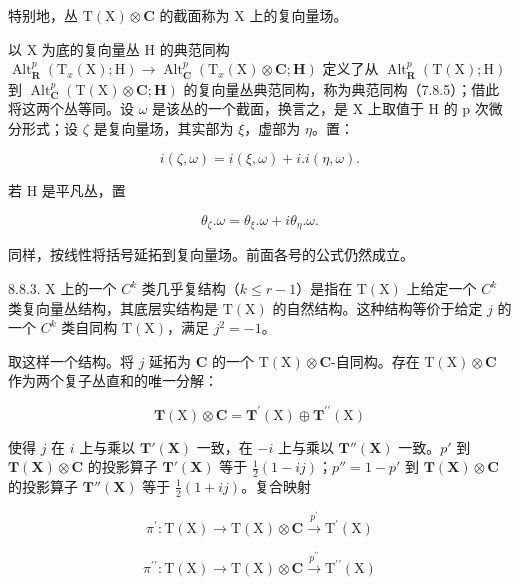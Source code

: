 特别地，丛 \(\mathrm{T}(\mathrm{X}) \otimes \mathbf{C}\) 的截面称为 X 上的复向量场。

以 X 为底的复向量丛 H 的典范同构 \(\operatorname{Alt}_{\mathbf{R}}^{p}(\mathrm{T}_{x}(\mathrm{X});\mathrm{H})\to\operatorname{Alt}_{\mathbf{C}}^{p}(\mathrm{T}_{x}(\mathrm{X})\otimes\mathbf{C};\mathbf{H})\) 定义了从 \(\operatorname{Alt}_{\mathbf{R}}^{p}(\mathrm{T}(\mathrm{X});\mathrm{H})\) 到 \(\operatorname{Alt}_{\mathbf{C}}^{p}(\mathrm{T}(\mathrm{X})\otimes\mathbf{C};\mathbf{H})\) 的复向量丛典范同构，称为典范同构（7.8.5）；借此将这两个丛等同。设 \(\omega\) 是该丛的一个截面，换言之，是 X 上取值于 H 的 p 次微分形式；设 \(\zeta\) 是复向量场，其实部为 \(\xi\)，虚部为 \(\eta\)。置：

\[
i (\zeta , \omega) = i (\xi , \omega) + i. i (\eta , \omega).
\]

若 H 是平凡丛，置

\[
\theta_ {\zeta}. \omega = \theta_ {\xi}. \omega + i \theta_ {\eta}. \omega .
\]

同样，按线性将括号延拓到复向量场。前面各号的公式仍然成立。

8.8.3. X 上的一个 \(C^{k}\) 类几乎复结构（\(k \leqslant r - 1\)）是指在 \(\mathrm{T}(\mathrm{X})\) 上给定一个 \(C^{k}\) 类复向量丛结构，其底层实结构是 \(\mathrm{T}(\mathrm{X})\) 的自然结构。这种结构等价于给定 \(j\) 的一个 \(C^{k}\) 类自同构 \(\mathrm{T}(\mathrm{X})\)，满足 \(j^{2} = -1\)。

取这样一个结构。将 \(j\) 延拓为 \(\mathbf{C}\) 的一个 \(\mathrm{T}(\mathrm{X}) \otimes \mathbf{C}\)-自同构。存在 \(\mathrm{T}(\mathrm{X}) \otimes \mathbf{C}\) 作为两个复子丛直和的唯一分解：

\[
\mathbf {T} (\mathrm{X}) \otimes \mathbf {C} = \mathbf {T} ^ {\prime} (\mathrm{X}) \oplus \mathbf {T} ^ {\prime \prime} (\mathrm{X})\tag{1}
\]

使得 \(j\) 在 \(i\) 上与乘以 \(\mathbf{T}'(\mathbf{X})\) 一致，在 \(-i\) 上与乘以 \(\mathbf{T}''(\mathbf{X})\) 一致。\(p'\) 到 \(\mathbf{T}(\mathbf{X}) \otimes \mathbf{C}\) 的投影算子 \(\mathbf{T}'(\mathbf{X})\) 等于 \(\frac{1}{2}(1 - ij)\)；\(p'' = 1 - p'\) 到 \(\mathbf{T}(\mathbf{X}) \otimes \mathbf{C}\) 的投影算子 \(\mathbf{T}''(\mathbf{X})\) 等于 \(\frac{1}{2}(1 + ij)\)。复合映射

\[
\pi^ {\prime} \colon \mathrm{T} (\mathrm{X}) \rightarrow \mathrm{T} (\mathrm{X}) \otimes \mathbf {C} \xrightarrow {p ^ {\prime}} \mathrm{T} ^ {\prime} (\mathrm{X})
\]

\[
\pi^ {\prime \prime}: \mathrm{T} (\mathrm{X}) \rightarrow \mathrm{T} (\mathrm{X}) \otimes \mathbf {C} \xrightarrow {p ^ {\prime \prime}} \mathrm{T} ^ {\prime \prime} (\mathrm{X})
\]

